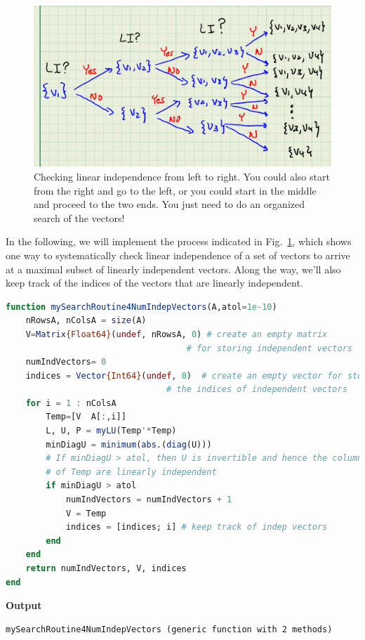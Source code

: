 \begin{figure}[htb]%
	\centering
\includegraphics[width=0.88\columnwidth]{graphics/Chap05/NumberLinearIndependentVectorsInSet.png}
\caption[]{Checking linear independence from left to right. You could also start from the right and go to the left, or you could start in the middle and proceed to the two ends. You just need to do an organized search of the vectors!}
    \label{fig:NumberLinearlyIndependentVectors}
\end{figure}

In the following, we will implement the process indicated in Fig.~\ref{fig:NumberLinearlyIndependentVectors}, which shows one way to systematically check linear independence of a set of vectors to arrive at a maximal subset of linearly independent vectors. Along the way, we'll also keep track of the indices of the vectors that are linearly independent.\\ 

\begin{lstlisting}[language=Julia,style=mystyle]
function mySearchRoutine4NumIndepVectors(A,atol=1e-10)
    nRowsA, nColsA = size(A)
    V=Matrix{Float64}(undef, nRowsA, 0) # create an empty matrix
                                    # for storing independent vectors
    numIndVectors= 0
    indices = Vector{Int64}(undef, 0)  # create an empty vector for storing
                                # the indices of independent vectors
    for i = 1 : nColsA
        Temp=[V  A[:,i]]
        L, U, P = myLU(Temp'*Temp)
        minDiagU = minimum(abs.(diag(U)))
        # If minDiagU > atol, then U is invertible and hence the columns
        # of Temp are linearly independent
        if minDiagU > atol
            numIndVectors = numIndVectors + 1
            V = Temp
            indices = [indices; i] # keep track of indep vectors
        end
    end
    return numIndVectors, V, indices
end
\end{lstlisting}
\textbf{Output} 
\begin{verbatim}
mySearchRoutine4NumIndepVectors (generic function with 2 methods)
\end{verbatim}

